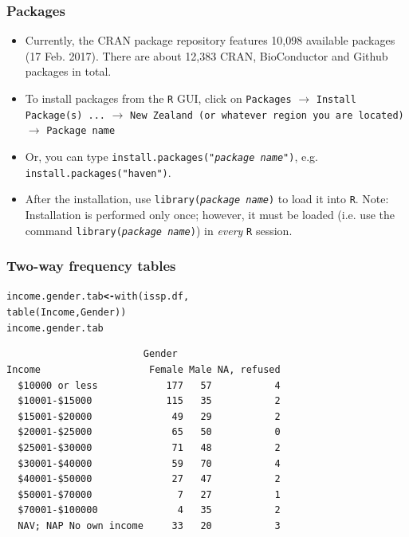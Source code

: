 \documentclass{beamer}\usepackage[]{graphicx}\usepackage[]{color}
\makeatletter
\newcommand{\hlstd}[1]{\textcolor[rgb]{0,0,0}{#1}}%
\newcommand{\hlkwb}[1]{\textcolor[rgb]{0,0,0.4}{\textbf{#1}}}%
\newcommand{\hlkwd}[1]{\textcolor[rgb]{0,0.267,0.4}{#1}}%
\newenvironment{kframe}{%
 \def\at@end@of@kframe{}%
 \ifinner\ifhmode%
  \def\at@end@of@kframe{\end{minipage}}%
  \begin{minipage}{\columnwidth}%
 \fi\fi%
 \def\FrameCommand##1{\hskip\@totalleftmargin \hskip-\fboxsep
 \colorbox{shadecolor}{##1}\hskip-\fboxsep
     \hskip-\linewidth \hskip-\@totalleftmargin \hskip\columnwidth}%
 \MakeFramed {\advance\hsize-\width
   \@totalleftmargin\z@ \linewidth\hsize
   \@setminipage}}%
 {\par\unskip\endMakeFramed%
 \at@end@of@kframe}
\newenvironment{knitrout}{}{} %
\makeatother
\begin{document}
\begin{frame}
  \frametitle{Packages}
  \begin{itemize}
  \item Currently, the CRAN package repository features 10,098 available
    packages (17 Feb. 2017). There are about 12,383 CRAN, BioConductor and Github packages in total.
  \item To install packages from the \texttt{R} GUI, click on
    \texttt{Packages} $\rightarrow$ \texttt{Install Package(s) ...}
    $\rightarrow$ \texttt{New Zealand (or whatever region you are
    located)} $\rightarrow$ \texttt{Package name}
  \item Or, you can type \texttt{install.packages("\textit{package name}")}, e.g. \texttt{install.packages("haven")}. 
  \item After the installation, use  \texttt{library(\textit{package name})}
        to load it into \texttt{R}. Note: Installation is performed only once; however,
        it must be loaded (i.e. use the command \texttt{library(\textit{package name})})
        in \emph{every} \texttt{R} session.
  \end{itemize}
\end{frame}


\begin{frame}[fragile]
  \frametitle{Two-way frequency tables}
\begin{knitrout}
\color{fgcolor}\begin{kframe}
\begin{alltt}
\hlstd{income.gender.tab} \hlkwb{<-} \hlkwd{with}\hlstd{(issp.df,}
                          \hlkwd{table}\hlstd{(Income, Gender))}
\hlstd{income.gender.tab}
\end{alltt}
\begin{verbatim}
                        Gender
Income                   Female Male NA, refused
  $10000 or less            177   57           4
  $10001-$15000             115   35           2
  $15001-$20000              49   29           2
  $20001-$25000              65   50           0
  $25001-$30000              71   48           2
  $30001-$40000              59   70           4
  $40001-$50000              27   47           2
  $50001-$70000               7   27           1
  $70001-$100000              4   35           2
  NAV; NAP No own income     33   20           3
\end{verbatim}
\end{kframe}
\end{knitrout}
\end{frame}
\end{document}

